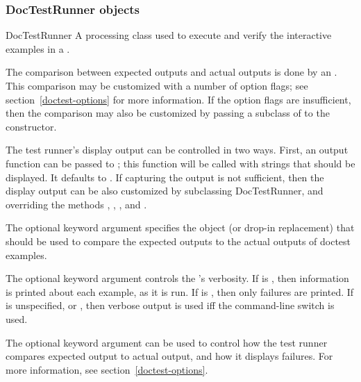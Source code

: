 \subsubsection{DocTestRunner objects\label{doctest-DocTestRunner}}
\begin{classdesc}{DocTestRunner}{}
    A processing class used to execute and verify the interactive
    examples in a .

    The comparison between expected outputs and actual outputs is done
    by an .  This comparison may be customized
    with a number of option flags; see section~\ref{doctest-options}
    for more information.  If the option flags are insufficient, then
    the comparison may also be customized by passing a subclass of
     to the constructor.

    The test runner's display output can be controlled in two ways.
    First, an output function can be passed to
    ; this function will be called with
    strings that should be displayed.  It defaults to
    .  If capturing the output is not
    sufficient, then the display output can be also customized by
    subclassing DocTestRunner, and overriding the methods
    , ,
    , and .

    The optional keyword argument  specifies the
     object (or drop-in replacement) that should
    be used to compare the expected outputs to the actual outputs of
    doctest examples.

    The optional keyword argument  controls the
    's verbosity.  If  is
    , then information is printed about each example, as it
    is run.  If  is , then only failures are
    printed.  If  is unspecified, or , then
    verbose output is used iff the command-line switch 
    is used.

    The optional keyword argument  can be used to
    control how the test runner compares expected output to actual
    output, and how it displays failures.  For more information, see
    section~\ref{doctest-options}.

\end{classdesc}

